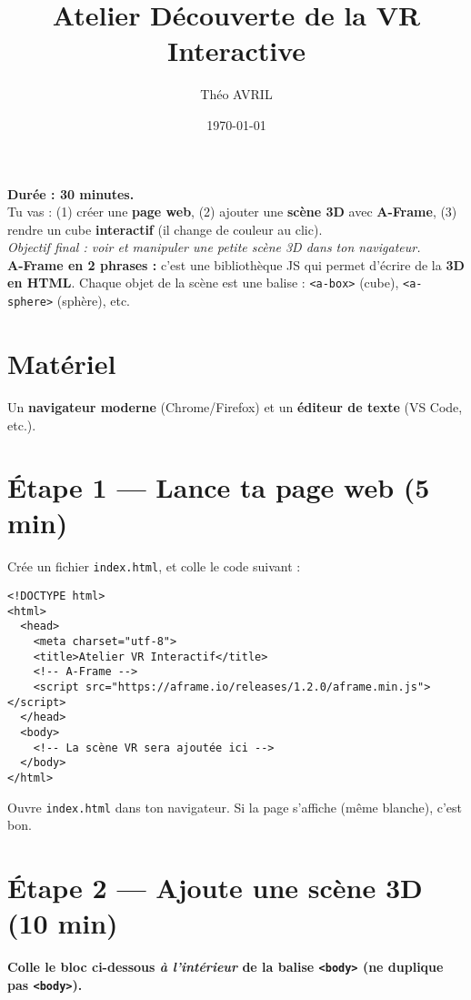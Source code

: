 \documentclass[12pt]{article}
\title{Atelier Découverte de la VR Interactive}
\author{Théo AVRIL}
\date{\today}
\begin{document}
\maketitle

\begin{objectifbox}
\textbf{Durée : 30 minutes.}\\
Tu vas : (1) créer une \textbf{page web}, (2) ajouter une \textbf{scène 3D} avec \textbf{A-Frame}, (3) rendre un cube \textbf{interactif} (il change de couleur au clic).\\[2pt]
\textit{Objectif final : voir et manipuler une petite scène 3D dans ton navigateur.}\\[4pt]
\textbf{A-Frame en 2 phrases :} c’est une bibliothèque JS qui permet d’écrire de la \textbf{3D en HTML}. Chaque objet de la scène est une balise : \texttt{<a-box>} (cube), \texttt{<a-sphere>} (sphère), etc.
\end{objectifbox}

\section*{Matériel}
Un \textbf{navigateur moderne} (Chrome/Firefox) et un \textbf{éditeur de texte} (VS Code, etc.).

\section{Étape 1 — Lance ta page web (5 min)}
Crée un fichier \texttt{index.html}, et colle le code suivant :

\begin{verbatim}
<!DOCTYPE html>
<html>
  <head>
    <meta charset="utf-8">
    <title>Atelier VR Interactif</title>
    <!-- A-Frame -->
    <script src="https://aframe.io/releases/1.2.0/aframe.min.js"></script>
  </head>
  <body>
    <!-- La scène VR sera ajoutée ici -->
  </body>
</html>
\end{verbatim}

\begin{checkpoint}
Ouvre \texttt{index.html} dans ton navigateur. Si la page s'affiche (même blanche), c'est bon.
\end{checkpoint}

\section{Étape 2 — Ajoute une scène 3D (10 min)}
\textbf{Colle le bloc ci-dessous \emph{à l'intérieur} de la balise \texttt{<body>} (ne duplique pas \texttt{<body>}).}
\end{document}
